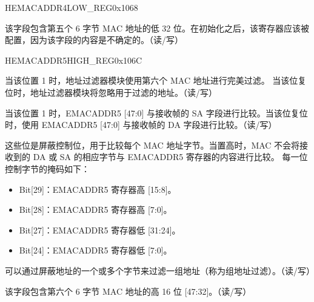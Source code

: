 \begin{register}{H}{EMACADDR4LOW\_REG}{0x1068}\label{regdesc:EMACADDR4LOWREG}
%
\regnewline%
\begin{regdesc}\begin{reglist}
\item [EMACADDR4LOW\_REG]该字段包含第五个 6 字节 MAC 地址的低 32 位。在初始化之后，该寄存器应该被配置，因为该字段的内容是不确定的。（读/写）
\end{reglist}\end{regdesc}
\end{register}

\begin{register}{H}{EMACADDR5HIGH\_REG}{0x106C}\label{regdesc:EMACADDR5HIGHREG}
%
%
%
%
%
\regnewline%
\begin{regdesc}\begin{reglist}
\item [ADDRESS\_ENABLE5]当该位置 1 时，地址过滤器模块使用第六个 MAC 地址进行完美过滤。 当该位复位时，地址过滤器模块将忽略用于过滤的地址。（读/写）
\item [SOURCE\_ADDRESS5]当该位置 1 时，EMACADDR5 [47:0] 与接收帧的 SA 字段进行比较。当该位复位时，使用 EMACADDR5 [47:0] 与接收帧的 DA 字段进行比较。（读/写）
\item [MASK\_BYTE\_CONTROL5] 这些位是屏蔽控制位，用于比较每个 MAC 地址字节。当置高时，MAC 不会将接收到的 DA 或 SA 的相应字节与 EMACADDR5 寄存器的内容进行比较。 每一位控制字节的掩码如下：
\begin{itemize}
\item Bit[29]：EMACADDR5 寄存器高 [15:8]。\item Bit[28]：EMACADDR5 寄存器高 [7:0]。\item Bit[27]：EMACADDR5 寄存器低 [31:24]。\item Bit[24]：EMACADDR5 寄存器低 [7:0]。\end{itemize}
可以通过屏蔽地址的一个或多个字节来过滤一组地址（称为组地址过滤）。（读/写）
\item [MAC\_ADDRESS5\_HI] 该字段包含第六个 6 字节 MAC 地址的高 16 位 [47:32]。（读/写）
\end{reglist}\end{regdesc}
\end{register}

